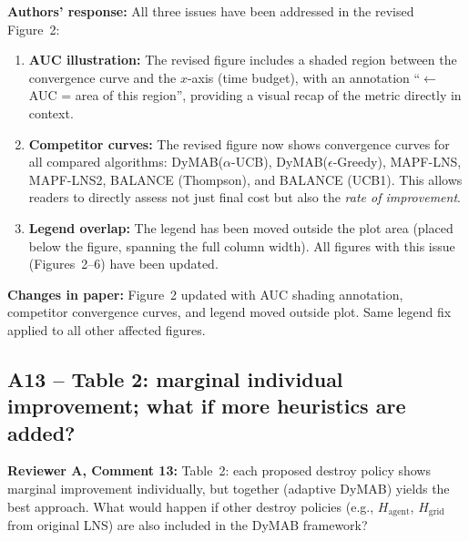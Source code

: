 \documentclass[review]{jair}
\begin{document}
\begin{authorbox}
\textbf{Authors' response:} All three issues have been addressed in the revised Figure~2:
\begin{enumerate}[leftmargin=2em]
  \item \textbf{AUC illustration:} The revised figure includes a shaded region between the convergence curve and the $x$-axis (time budget), with an annotation ``$\leftarrow$ AUC = area of this region'', providing a visual recap of the metric directly in context.
  \item \textbf{Competitor curves:} The revised figure now shows convergence curves for all compared algorithms: DyMAB($\alpha$-UCB), DyMAB($\epsilon$-Greedy), MAPF-LNS, MAPF-LNS2, BALANCE (Thompson), and BALANCE (UCB1). This allows readers to directly assess not just final cost but also the \emph{rate of improvement}.
  \item \textbf{Legend overlap:} The legend has been moved outside the plot area (placed below the figure, spanning the full column width). All figures with this issue (Figures~2--6) have been updated.
\end{enumerate}
\end{authorbox}

\begin{changebox}
\textbf{Changes in paper:} Figure~2 updated with AUC shading annotation, competitor convergence curves, and legend moved outside plot. Same legend fix applied to all other affected figures.
\end{changebox}

\subsection*{A13 -- Table 2: marginal individual improvement; what if more heuristics are added?}

\begin{reviewerbox}
\textbf{Reviewer A, Comment 13:} Table~2: each proposed destroy policy shows marginal improvement individually, but together (adaptive DyMAB) yields the best approach. What would happen if other destroy policies (e.g., $H_{\text{agent}}$, $H_{\text{grid}}$ from original LNS) are also included in the DyMAB framework?
\end{reviewerbox}
\end{document}
